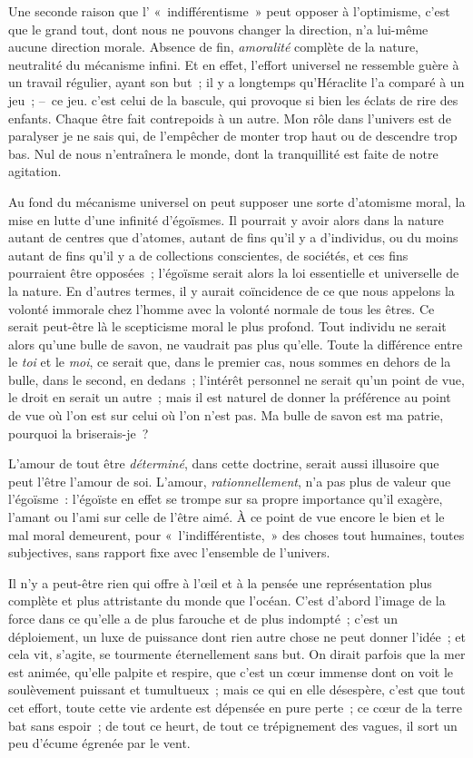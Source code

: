 \documentclass[french,twoside]{book} %
\begin{document}
Une seconde raison que l’ « indifférentisme » peut opposer à l’optimisme, c’est que le grand tout, dont nous ne pouvons changer la direction, n’a lui-même aucune direction morale. Absence de fin, \emph{amoralité} complète de la nature, neutralité du mécanisme infini. Et en effet, l’effort universel ne ressemble guère à un travail régulier, ayant son but ; il y a longtemps qu’Héraclite l’a comparé à un jeu ; – ce jeu. c’est celui de la bascule, qui provoque si bien les éclats de rire des enfants. Chaque être fait contrepoids à un autre. Mon rôle dans l’univers est de paralyser je ne sais qui, de l’empêcher de monter trop haut ou de descendre trop bas. Nul de nous n’entraînera le monde, dont la tranquillité est faite de notre agitation.\par
Au fond du mécanisme universel on peut supposer une sorte d’atomisme moral, la mise en lutte d’une infinité d’égoïsmes. Il pourrait y avoir alors dans la nature autant de centres que d’atomes, autant de fins qu’il y a d’individus, ou du moins autant de fins qu’il y a de collections conscientes, de sociétés, et ces fins pourraient être opposées ; l’égoïsme serait alors la loi essentielle et universelle de la nature. En d’autres termes, il y aurait coïncidence de ce que nous appelons la volonté immorale chez l’homme avec la volonté normale de tous les êtres. Ce serait peut-être là le scepticisme moral le plus profond. Tout individu ne serait alors qu’une bulle de savon, ne vaudrait pas plus qu’elle. Toute la différence entre le \emph{toi} et le \emph{moi}, ce serait que, dans le premier cas, nous sommes en dehors de la bulle, dans le second, en dedans ; l’intérêt personnel ne serait qu’un point de vue, le droit en serait un autre ; mais il est naturel de donner la préférence au point de vue où l’on est sur celui où l’on n’est pas. Ma bulle de savon est ma patrie, pourquoi la briserais-je ?\par
L’amour de tout être \emph{déterminé}, dans cette doctrine, serait aussi illusoire que peut l’être l’amour de soi. L’amour, \emph{rationnellement}, n’a pas plus de valeur que l’égoïsme : l’égoïste en effet se trompe sur sa propre importance qu’il exagère, l’amant ou l’ami sur celle de l’être aimé. À ce point de vue encore le bien et le mal moral demeurent, pour « l’indifférentiste, » des choses tout humaines, toutes subjectives, sans rapport fixe avec l’ensemble de l’univers.\par
Il n’y a peut-être rien qui offre à l’œil et à la pensée une représentation plus complète et plus attristante du monde que l’océan. C’est d’abord l’image de la force dans ce qu’elle a de plus farouche et de plus indompté ; c’est un déploiement, un luxe de puissance dont rien autre chose ne peut donner l’idée ; et cela vit, s’agite, se tourmente éternellement sans but. On dirait parfois que la mer est animée, qu’elle palpite et respire, que c’est un cœur immense dont on voit le soulèvement puissant et tumultueux ; mais ce qui en elle désespère, c’est que tout cet effort, toute cette vie ardente est dépensée en pure perte ; ce cœur de la terre bat sans espoir ; de tout ce heurt, de tout ce trépignement des vagues, il sort un peu d’écume égrenée par le vent.\par
\end{document}
